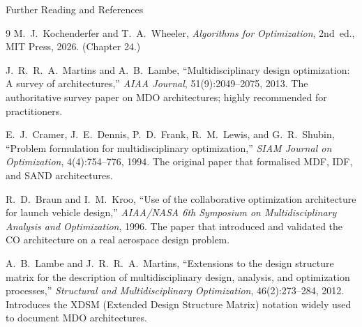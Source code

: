 \documentclass[aspectratio=169,10pt]{beamer}
\begin{document}
\begin{frame}{Further Reading and References}
  \begin{thebibliography}{9}
    M.~J.\ Kochenderfer and T.~A.\ Wheeler,
    \textit{Algorithms for Optimization}, 2nd~ed.,
    MIT Press, 2026. (Chapter 24.)

    J.~R.~R.~A.\ Martins and A.~B.\ Lambe,
    ``Multidisciplinary design optimization: A survey of architectures,''
    \textit{AIAA Journal}, 51(9):2049--2075, 2013.
    The authoritative survey paper on MDO architectures; highly recommended
    for practitioners.

    E.~J.\ Cramer, J.~E.~Dennis, P.~D.\ Frank, R.~M.\ Lewis,
    and G.~R.\ Shubin,
    ``Problem formulation for multidisciplinary optimization,''
    \textit{SIAM Journal on Optimization}, 4(4):754--776, 1994.
    The original paper that formalised MDF, IDF, and SAND architectures.

    R.~D.\ Braun and I.~M.\ Kroo,
    ``Use of the collaborative optimization architecture for launch
    vehicle design,''
    \textit{AIAA/NASA 6th Symposium on Multidisciplinary Analysis
    and Optimization}, 1996.
    The paper that introduced and validated the CO architecture on a
    real aerospace design problem.

    A.~B.\ Lambe and J.~R.~R.~A.\ Martins,
    ``Extensions to the design structure matrix for the description
    of multidisciplinary design, analysis, and optimization processes,''
    \textit{Structural and Multidisciplinary Optimization},
    46(2):273--284, 2012.
    Introduces the XDSM (Extended Design Structure Matrix) notation
    widely used to document MDO architectures.
  \end{thebibliography}
\end{frame}
\end{document}
